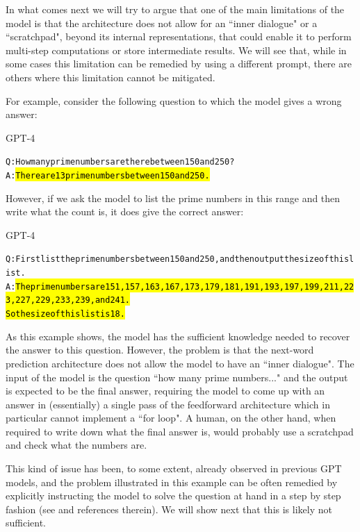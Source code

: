In what comes next we will try to argue that one of the main limitations of the model is that the architecture does not allow for an ``inner dialogue" or a ``scratchpad", beyond its internal representations, that could enable it to perform multi-step computations or store intermediate results. We will see that, while in some cases this limitation can be remedied by using a different prompt, there are others where this limitation cannot be mitigated.

For example, consider the following question to which the model gives a wrong answer:

\begin{AIbox}{GPT-4}
\begin{alltt}
Q: How many prime numbers are there between 150 and 250? \\
A: \hl{There are 13 prime numbers between 150 and 250.}
\end{alltt}
\end{AIbox}

However, if we ask the model to list the prime numbers in this range and then write what the count is, it does give the correct answer:

\begin{AIbox}{GPT-4}
\scriptsize
\parbox{1\textwidth}{
\begin{alltt}
Q: First list the prime numbers between 150 and 250, and then output the size of this list. \\
A: \hl{The prime numbers are 151, 157, 163, 167, 173, 179, 181, 191, 193, 197, 199, 211, 223, 227, 229, 233, 239, and 241. \\

So the size of this list is 18.}
\end{alltt}
}
\end{AIbox}

As this example shows, the model has the sufficient knowledge needed to recover the answer to this question. However, the problem is that the next-word prediction architecture does not allow the model to have an ``inner dialogue". The input of the model is the question ``how many prime numbers..." and the output is expected to be the final answer, requiring the model to come up with an answer in (essentially) a single pass of the feedforward architecture which in particular cannot implement a ``for loop". A human, on the other hand, when required to write down what the final answer is, would probably use a scratchpad and check what the numbers are.

This kind of issue has been, to some extent, already observed in previous GPT models, and the problem illustrated in this example can be often remedied by explicitly instructing the model to solve the question at hand in a step by step fashion (see \cite{wei2022chain} and references therein). We will show next that this is likely not sufficient.

